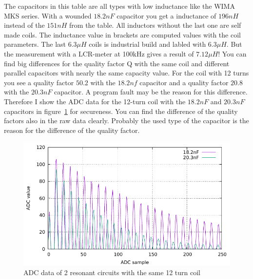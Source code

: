The capacitors in this table are all types with low inductance like the
WIMA MKS series. With a wounded \(18.2nF\) capacitor you get a inductance of
\(196nH\) instead of the \(151nH\) from the table.
All inductors without the last one are self made coils.
The inductance value in brackets are computed values with the coil parameters.
The last \(6.3\mu H\) coils is industrial build and labled with \(6.3\mu H\).
But the measurement with a LCR-meter at 100kHz gives a result of \(7.12\mu H\)!
You can find big differences for the quality factor Q with the same coil and
different parallel capacitors with nearly the same capacity value. 
For the coil with 12 turns you see a quality factor \(50.2\) with the \(18.2nf\)
capacitor and a quality factor \(20.8\) with the \(20.3nF\) capacitor.
A program fault may be the reason for this difference.
Therefore I show the ADC data for the 12-turn coil with the \(18.2nF\) and \(20.3nF\)
capacitors in figure~\ref{fig:W12compare} for secureness.
You can find the difference of the quality factors also in the raw data clearly.
Probably the used type of the capacitor is the reason for the difference of
the quality factor.

\begin{figure}[H]
\centering
\includegraphics[width=.9\textwidth]{../GNU/W12compare.pdf}
\caption{ADC data of 2 resonant circuits with the same 12 turn coil}
\label{fig:W12compare}
\end{figure}

